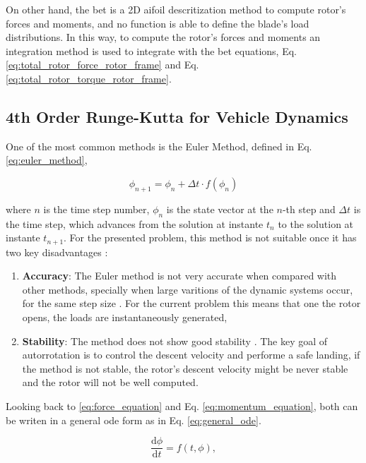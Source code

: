 On other hand, the \gls{bet} is a 2D aifoil descritization method to compute rotor's forces and moments, and no function is able to define the blade's load distributions. In this way, to compute the rotor's forces and moments an integration method is used to integrate with the \gls{bet} equations, Eq. \ref{eq:total_rotor_force_rotor_frame} and Eq. \ref{eq:total_rotor_torque_rotor_frame}.

\subsection{4th Order Runge-Kutta for Vehicle Dynamics}
\label{sec:runge-kutta}

One of the most common methods is the Euler Method, defined in Eq. \ref{eq:euler_method},

\begin{equation}
    \phi_{n+1} = \phi_n + \Delta t \cdot f(\phi_n)
    \label{eq:euler_method}
\end{equation}

where $n$ is the time step number, $\phi_n$ is the state vector at the $n$-th step and $\Delta t$ is the time step, which advances from the solution at instante $t_n$ to the solution at instante $t_{n+1}$. For the presented problem, this method is not suitable once it has two key disadvantages \cite{press_numerical_2007}:

\begin{enumerate}
    \item \textbf{Accuracy}: The Euler method is not very accurate when compared with other methods, specially when large varitions of the dynamic systems occur, for the same step size \cite{press_numerical_2007}. For the current problem this means that one the rotor opens, the loads are instantaneously generated, 
    \item \textbf{Stability}: The method does not show good stability \cite{press_numerical_2007}. The key goal of autorrotation is to control the descent velocity and performe a safe landing, if the method is not stable, the rotor's descent velocity might be never stable and the rotor will not be well computed.
\end{enumerate}

Looking back to \ref{eq:force_equation} and Eq. \ref{eq:momentum_equation}, both can be writen in a general \gls{ode} form as in Eq. \ref{eq:general_ode}.

\begin{equation}
    \frac{\mathrm{d}\phi}{\mathrm{d}t} = f(t, \phi),
    \label{eq:general_ode}
\end{equation}


